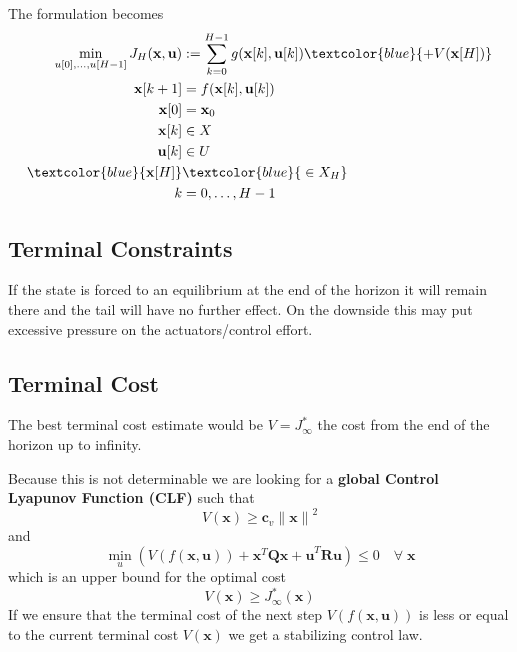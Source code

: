 The formulation becomes
\begin{align*}
    \min_{u[0], \ldots, u[H-1]} J_{H}(\mathbf{x,u}) & := \sum_{k=0}^{H-1}g(\mathbf{x}[k],\mathbf{u}[k]) \textcolor{blue}{+V(\textbf{x}[H])} \\
    \mathbf{x}[k+1]                                 & = f(\mathbf{x}[k], \mathbf{u}[k])                                                     \\
    \mathbf{x}[0]                                   & = \mathbf{x}_0                                                                        \\
    \mathbf{x}[k]                                   & \in X                                                                                 \\
    \mathbf{u}[k]                                   & \in U                                                                                 \\
    \textcolor{blue}{\mathbf{x}[H]}                 & \textcolor{blue}{\;\in X_H}                                                           \\
    k                                               & = 0,\ldots,H-1
\end{align*}

\subsection{Terminal Constraints}\label{mpc_terminal_constraint}

If the state is forced to an equilibrium at the end of the horizon it will remain there and the tail will have no further effect. On the downside this may put excessive pressure on the actuators/control effort.

\subsection{Terminal Cost}\label{mpc_terminal_cost}

The best terminal cost estimate would be $V = J^*_\infty$ the cost from the end of the horizon up to infinity.

Because this is not determinable we are looking for a \textbf{global Control Lyapunov Function (CLF)} such that
\begin{equation*}
    V(\mathbf{x}) \geq \mathbf{c}_v {\lVert \mathbf{x} \rVert}^2
\end{equation*}
and
\begin{equation*}
    \min_{u}(V(f(\mathbf{x,u})) + \mathbf{x}^T \mathbf{Qx + u}^T \mathbf{R u}) \leq 0 \quad \forall \; \mathbf{x}
\end{equation*}
which is an upper bound for the optimal cost
\begin{equation*}
    V(\mathbf{x}) \geq J^*_\infty (\mathbf{x})
\end{equation*}
If we ensure that the terminal cost of the next step $V(f(\mathbf{x,u}))$ is less or equal to the current terminal cost $V(\mathbf{x})$ we get a stabilizing control law.

